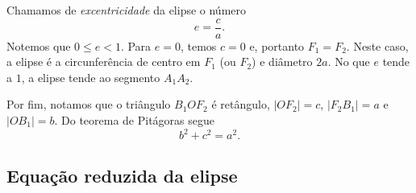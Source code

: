 Chamamos de \emph{excentricidade} da elipse o número
\begin{equation}
  e = \frac{c}{a}.
\end{equation}
Notemos que $0 \leq e < 1$. Para $e=0$, temos $c=0$ e, portanto $F_1=F_2$. Neste caso, a elipse é a circunferência de centro em $F_1$ (ou $F_2$) e diâmetro $2a$. No que $e$ tende a $1$, a elipse tende ao segmento $A_1A_2$.

Por fim, notamos que o triângulo $B_1OF_2$ é retângulo, $|OF_2|=c$, $|F_2B_1|=a$ e $|OB_1|=b$. Do teorema de Pitágoras segue
\begin{equation}\label{eq:elipse_obs}
  b^2 + c^2 = a^2.
\end{equation}

\subsection{Equação reduzida da elipse}

